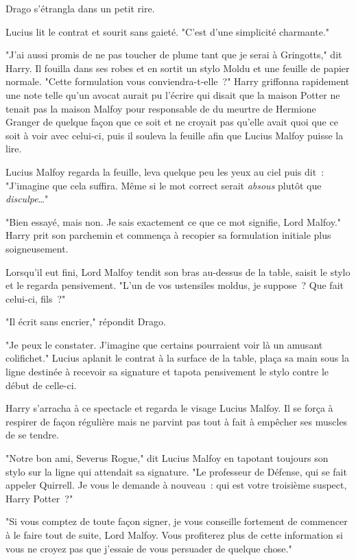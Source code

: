 Drago s'étrangla dans un petit rire.

Lucius lit le contrat et sourit sans gaieté. "C'est d'une simplicité charmante."

"J'ai aussi promis de ne pas toucher de plume tant que je serai à Gringotts," dit Harry. Il fouilla dans ses robes et en sortit un stylo Moldu et une feuille de papier normale. "Cette formulation vous conviendra-t-elle~?" Harry griffonna rapidement une note telle qu'un avocat aurait pu l'écrire qui disait que la maison Potter ne tenait pas la maison Malfoy pour responsable de du meurtre de Hermione Granger de quelque façon que ce soit et ne croyait pas qu'elle avait quoi que ce soit à voir avec celui-ci, puis il souleva la feuille afin que Lucius Malfoy puisse la lire.

Lucius Malfoy regarda la feuille, leva quelque peu les yeux au ciel puis dit~: "J'imagine que cela suffira. Même si le mot correct serait \emph{absous} plutôt que \emph{disculpe}…"

"Bien essayé, mais non. Je sais exactement ce que ce mot signifie, Lord Malfoy." Harry prit son parchemin et commença à recopier sa formulation initiale plus soigneusement.

Lorsqu'il eut fini, Lord Malfoy tendit son bras au-dessus de la table, saisit le stylo et le regarda pensivement. "L'un de vos ustensiles moldus, je suppose~? Que fait celui-ci, fils~?"

"Il écrit sans encrier," répondit Drago.

"Je peux le constater. J'imagine que certains pourraient voir là un amusant colifichet." Lucius aplanit le contrat à la surface de la table, plaça sa main sous la ligne destinée à recevoir sa signature et tapota pensivement le stylo contre le début de celle-ci.

Harry s'arracha à ce spectacle et regarda le visage Lucius Malfoy. Il se força à respirer de façon régulière mais ne parvint pas tout à fait à empêcher ses muscles de se tendre.

"Notre bon ami, Severus Rogue," dit Lucius Malfoy en tapotant toujours son stylo sur la ligne qui attendait sa signature. "Le professeur de Défense, qui se fait appeler Quirrell. Je vous le demande à nouveau~: qui est votre troisième suspect, Harry Potter~?"

"Si vous comptez de toute façon signer, je vous conseille fortement de commencer à le faire tout de suite, Lord Malfoy. Vous profiterez plus de cette information si vous ne croyez pas que j'essaie de vous persuader de quelque chose."

